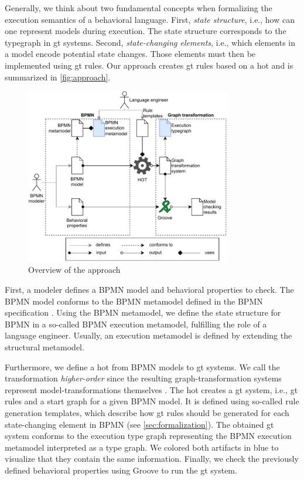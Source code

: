 \documentclass[runningheads]{llncs}
\begin{document}
Generally, we think about two fundamental concepts when formalizing the execution semantics of a behavioral language.
First, \textit{state structure}, i.e., how can one represent models during execution.
The state structure corresponds to the typegraph in \gls*{gt} systems.
Second, \textit{state-changing elements}, i.e., which elements in a model encode potential state changes.
Those elements must then be implemented using \gls*{gt} rules.
Our approach creates \gls*{gt} rules based on a \gls*{hot} and is summarized in \autoref{fig:approach}.

\begin{figure}[ht]
    \centering
    \includegraphics[width=0.8\textwidth]{images/bpmn_semantics-overview.pdf}
    \caption{Overview of the approach}
    \label{fig:approach}
\end{figure}

First, a modeler defines a BPMN model and behavioral properties to check.
The BPMN model conforms to the BPMN metamodel defined in the BPMN specification \cite{objectmanagementgroupBusinessProcessModel2013}.
Using the BPMN metamodel, we define the state structure for BPMN in a so-called BPMN execution metamodel, fulfilling the role of a language engineer.
Usually, an execution metamodel is defined by extending the structural metamodel.

Furthermore, we define a \gls*{hot} from BPMN models to \gls*{gt} systems.
We call the transformation \textit{higher-order} since the resulting graph-transformation systems represent model-transformations themselves \cite{tisiUseHigherOrderModel2009}.
The \gls*{hot} creates a \gls*{gt} system, i.e., \gls*{gt} rules and a start graph for a given BPMN model.
It is defined using so-called rule generation templates, which describe how \gls*{gt} rules should be generated for each state-changing element in BPMN (see \autoref{sec:formalization}).
The obtained \gls*{gt} system conforms to the execution type graph representing the BPMN execution metamodel interpreted as a type graph.
We colored both artifacts in blue to visualize that they contain the same information.
Finally, we check the previously defined behavioral properties using Groove to run the \gls*{gt} system.
\end{document}

